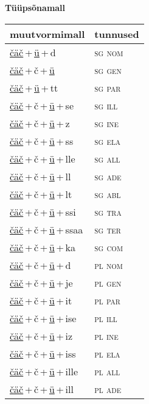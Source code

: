 
\vspace{1.8em}
\begin{minipage}{\textwidth}
\textbf{Tüüpsõnamall \,}\\

\begin{sideways}
\begin{tabular}{l l}
muutvormimall & tunnused \\
\hline
\underline{čäč}\,+\,\underline{ü}\,+\,d & \textsc{ sg nom } \\
\underline{čäč}\,+\,č\,+\,\underline{ü} & \textsc{ sg gen } \\
\underline{čäč}\,+\,\underline{ü}\,+\,tt & \textsc{ sg par } \\
\underline{čäč}\,+\,č\,+\,\underline{ü}\,+\,se & \textsc{ sg ill } \\
\underline{čäč}\,+\,č\,+\,\underline{ü}\,+\,z & \textsc{ sg ine } \\
\underline{čäč}\,+\,č\,+\,\underline{ü}\,+\,ss & \textsc{ sg ela } \\
\underline{čäč}\,+\,č\,+\,\underline{ü}\,+\,lle & \textsc{ sg all } \\
\underline{čäč}\,+\,č\,+\,\underline{ü}\,+\,ll & \textsc{ sg ade } \\
\underline{čäč}\,+\,č\,+\,\underline{ü}\,+\,lt & \textsc{ sg abl } \\
\underline{čäč}\,+\,č\,+\,\underline{ü}\,+\,ssi & \textsc{ sg tra } \\
\underline{čäč}\,+\,č\,+\,\underline{ü}\,+\,ssaa & \textsc{ sg ter } \\
\underline{čäč}\,+\,č\,+\,\underline{ü}\,+\,ka & \textsc{ sg com } \\
\underline{čäč}\,+\,č\,+\,\underline{ü}\,+\,d & \textsc{ pl nom } \\
\underline{čäč}\,+\,č\,+\,\underline{ü}\,+\,je & \textsc{ pl gen } \\
\underline{čäč}\,+\,č\,+\,\underline{ü}\,+\,it & \textsc{ pl par } \\
\underline{čäč}\,+\,č\,+\,\underline{ü}\,+\,ise & \textsc{ pl ill } \\
\underline{čäč}\,+\,č\,+\,\underline{ü}\,+\,iz & \textsc{ pl ine } \\
\underline{čäč}\,+\,č\,+\,\underline{ü}\,+\,iss & \textsc{ pl ela } \\
\underline{čäč}\,+\,č\,+\,\underline{ü}\,+\,ille & \textsc{ pl all } \\
\underline{čäč}\,+\,č\,+\,\underline{ü}\,+\,ill & \textsc{ pl ade } \\

\end{tabular}
\end{sideways}
\end{minipage}

